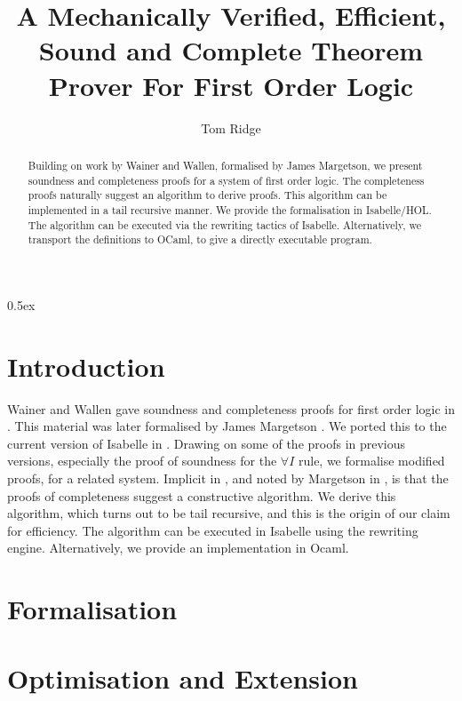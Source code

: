 \documentclass[11pt,a4paper]{article}
\begin{document}
\title{A Mechanically Verified, Efficient, Sound and Complete Theorem Prover For First Order Logic}
\author{Tom Ridge}
\maketitle

\begin{abstract}
  Building on work by Wainer and Wallen, formalised by James
  Margetson, we present soundness and completeness proofs for a system
  of first order logic. The completeness proofs naturally suggest an
  algorithm to derive proofs. This algorithm can be implemented in a
  tail recursive manner. We provide the formalisation in Isabelle/HOL\@.
  The algorithm can be executed via the rewriting tactics of Isabelle.
  Alternatively, we transport the definitions to OCaml, to give a
  directly executable program.
\end{abstract}

\tableofcontents

\parindent 0pt\parskip 0.5ex

\section{Introduction}

Wainer and Wallen gave soundness and completeness proofs for first
order logic in \cite{Wainer:92}. This material was later formalised by
James Margetson \cite{margetson99completeness}. We ported this to the
current version of Isabelle in \cite{margetson04completeness}. Drawing
on some of the proofs in previous versions, especially the proof of
soundness for the $\forall I$ rule, we formalise modified proofs, for
a related system. Implicit in \cite{Wainer:92}, and noted by Margetson
in \cite{margetson99completeness}, is that the proofs of completeness
suggest a constructive algorithm. We derive this algorithm, which
turns out to be tail recursive, and this is the origin of our claim
for efficiency. The algorithm can be executed in Isabelle using the
rewriting engine. Alternatively, we provide an implementation in
Ocaml.

\section{Formalisation}


\section{Optimisation and Extension}
\end{document}
